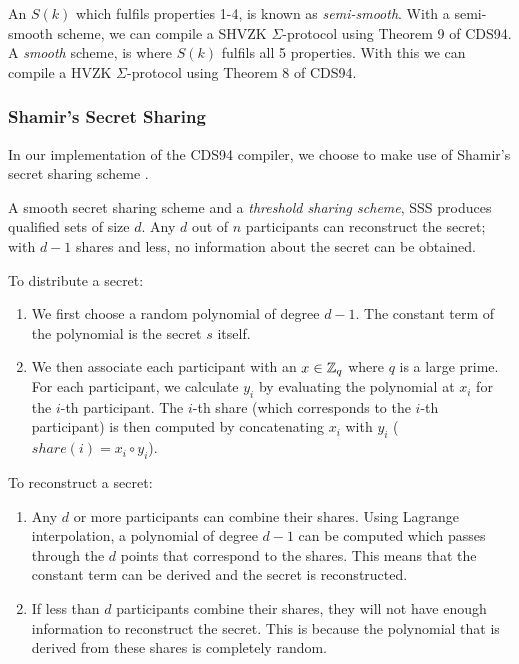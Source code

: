 An $S(k)$ which fulfils properties 1-4, is known as \textit{semi-smooth}. With a semi-smooth scheme, we can compile a SHVZK $\Sigma$-protocol using Theorem 9 of CDS94. A \textit{smooth} scheme, is where $S(k)$ fulfils all 5 properties. With this we can compile a HVZK $\Sigma$-protocol using Theorem 8 of CDS94.

\subsubsection{Shamir's Secret Sharing}\label{sec:sss}
In our implementation of the CDS94 compiler, we choose to make use of Shamir's secret sharing scheme \cite{DBLP:journals/cacm/Shamir79}. 

\begin{definition} \label{def:sss}
 A smooth secret sharing scheme and a \textit{threshold sharing scheme}, SSS produces qualified sets of size $d$. Any $d$ out of $n$ participants can reconstruct the secret; with $d-1$ shares and less, no information about the secret can be obtained. 

 To distribute a secret:
\begin{enumerate}
    \item We first choose a random polynomial of degree $d - 1$. The constant term of the polynomial is the secret $s$ itself.
    \item We then associate each participant with an $x \in \mathbb{Z}_q$ where $q$ is a large prime. For each participant, we calculate $y_i$ by evaluating the polynomial at $x_i$ for the $i$-th participant. The $i$-th share (which corresponds to the $i$-th participant) is then computed by concatenating $x_i$ with $y_i$ ($share(i) = x_i\circ y_i$).
\end{enumerate}

To reconstruct a secret:
\begin{enumerate}
    \item Any $d$ or more participants can combine their shares. Using Lagrange interpolation, a polynomial of degree $d - 1$ can be computed which passes through the $d$ points that correspond to the shares. This means that the constant term can be derived and the secret is reconstructed. 
    \item If less than $d$ participants combine their shares, they will not have enough information to reconstruct the secret. This is because the polynomial that is derived from these shares is completely random. 
\end{enumerate}
\end{definition}

